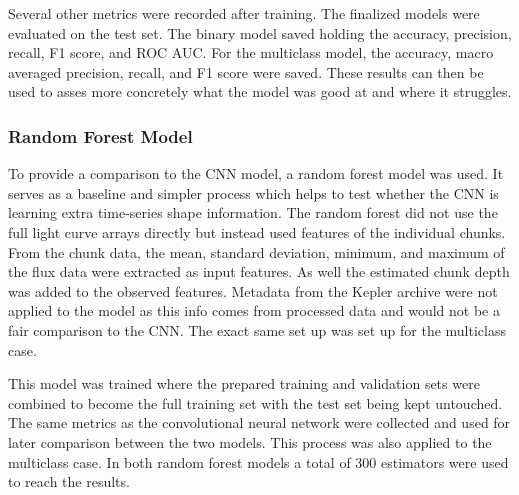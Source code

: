 Several other metrics were recorded after training. The finalized models were evaluated on the test set. The binary model saved holding the accuracy, precision, recall, F1 score, and ROC AUC. For the multiclass model, the accuracy, macro averaged precision, recall, and F1 score were saved. These results can then be used to asses more concretely what the model was good at and where it struggles.

\subsubsection{Random Forest Model}

To provide a comparison to the CNN model, a random forest model was used. It serves as a baseline and simpler process which helps to test whether the CNN is learning extra time-series shape information. The random forest did not use the full light curve arrays directly but instead used features of the individual chunks. From the chunk data, the mean, standard deviation, minimum, and maximum of the flux data were extracted as input features. As well the estimated chunk depth was added to the observed features. Metadata from the Kepler archive were not applied to the model as this info comes from processed data and would not be a fair comparison to the CNN. The exact same set up was set up for the multiclass case.

This model was trained where the prepared training and validation sets were combined to become the full training set with the test set being kept untouched. The same metrics as the convolutional neural network were collected and used for later comparison between the two models. This process was also applied to the multiclass case. In both random forest models a total of 300 estimators were used to reach the results.


